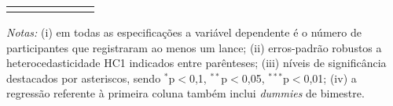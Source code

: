 \begin{table}[!htbp]
\begin{threeparttable}
\begin{tabular}{lcccccc}
\hline \\[-1.8ex] 
\end{tabular}
\begin{tablenotes}
\footnotesize
\emph{Notas:} (i) em todas as especificações a variável dependente é o número de participantes que registraram ao menos um lance; (ii) erros-padrão robustos a heterocedasticidade HC1 indicados entre parênteses; (iii) níveis de significância destacados por asteriscos, sendo  $^{*}$p$<$0,1, $^{**}$p$<$0,05, $^{***}$p$<$0,01; (iv) a regressão referente à primeira coluna também inclui \textit{dummies} de bimestre.\\ 
\end{tablenotes}
\end{threeparttable}
\end{table}